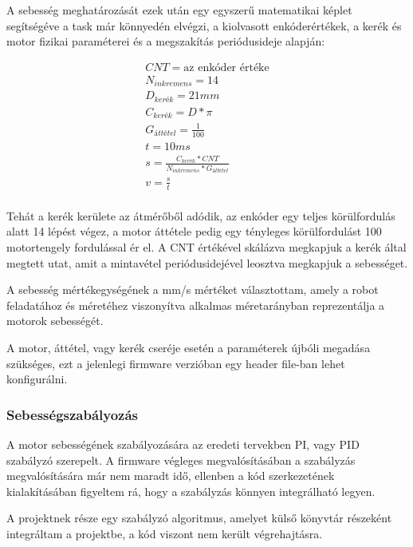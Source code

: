 A sebesség meghatározását ezek után egy egyszerű matematikai képlet segítségéve a
task már könnyedén elvégzi, a kiolvasott enkóderértékek, a kerék és motor fizikai
paraméterei és a megszakítás periódusideje alapján:

\begin{eqnarray*}
CNT = \text{az enkóder értéke} \\
N_{inkremens} = 14 \\
D_{kerék} = 21 mm \\
C_{kerék} = D * \pi \\
G_{áttétel} = \frac{1}{100} \\
t = 10 ms \\
s = \frac{C_{kerék} * CNT}{N_{inkremens} * G_{áttétel}} \\
v = \frac{s}{t} \\
\end{eqnarray*}

Tehát a kerék kerülete az átmérőből adódik, az enkóder egy teljes körülfordulás
alatt 14 lépést végez, a motor áttétele pedig egy tényleges körülfordulást 100
motortengely fordulással ér el. A CNT értékével skálázva megkapjuk a kerék által
megtett utat, amit a mintavétel periódusidejével leosztva megkapjuk a
sebességet.

A sebesség mértékegységének a mm/s mértéket választottam, amely a robot
feladatához  és méretéhez viszonyítva alkalmas méretarányban reprezentálja a
motorok sebességét.

A motor, áttétel, vagy kerék cseréje esetén a paraméterek újbóli megadása
szükséges, ezt a jelenlegi firmware verzióban egy header file-ban lehet
konfigurálni. 

\subsubsection{Sebességszabályozás}

A motor sebességének szabályozására az eredeti tervekben PI, vagy PID szabályzó
szerepelt. A firmware végleges megvalósításában a szabályzás megvalósítására már
nem maradt idő, ellenben a kód szerkezetének kialakításában figyeltem rá, hogy a
szabályzás könnyen integrálható legyen.

A projektnek része egy szabályzó algoritmus, amelyet külső könyvtár
részeként integráltam a projektbe, a kód viszont nem került
végrehajtásra.


